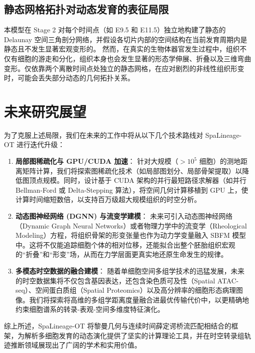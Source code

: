 \subsection{静态网格拓扑对动态发育的表征局限}
本模型在 Stage 2 对每个时间点（如 E9.5 和 E11.5）独立地构建了静态的 Delaunay 空间三角剖分网络，并假设各切片内部的空间结构在当前发育周期内是静态且不发生显著宏观变形的。
然而，在真实的生物体器官发生过程中，组织不仅有细胞的游走和分化，组织本身也会发生显著的形态学伸展、折叠以及三维弯曲变形。仅依靠两个离散时间点处独立的静态网格，在应对剧烈的非线性组织形变时，可能会丢失部分动态的几何拓扑关系。

\section{未来研究展望}
为了克服上述局限，我们在未来的工作中将从以下几个技术路线对 SpaLineage-OT 进行迭代升级：

\begin{enumerate}
    \item \textbf{局部图稀疏化与 GPU/CUDA 加速}：
    针对大规模（$>10^5$ 细胞）的测地距离矩阵计算，我们将探索图稀疏化技术（如局部图划分、局部骨架提取）以降低图顶点规模。同时，设计基于 CUDA 架构的并行最短路径求解器（如并行 Bellman-Ford 或 Delta-Stepping 算法），将空间几何计算移植到 GPU 上，使计算时间缩短数倍，以支持百万级超大规模组织的时空分析。
    
    \item \textbf{动态图神经网络 (DGNN) 与流变学建模}：
    未来可引入动态图神经网络（Dynamic Graph Neural Networks）或者物理力学中的流变学（Rheological Modeling）方程，将组织骨架的形变张量也作为动力学变量融入 SBFM 模型中。这将不仅能追踪细胞个体的相对位移，还能拟合出整个胚胎组织宏观的“折叠”和“形变”场，从而在力学层面更真实地还原生命发生的规律。
    
    \item \textbf{多模态时空数据的融合建模}：
    随着单细胞空间多组学技术的迅猛发展，未来的时空数据集将不仅包含基因表达，还包含染色质可及性（Spatial ATAC-seq）、空间蛋白质组（Spatial Proteomics）以及高分辨率的细胞形态病理图像。我们将探索将高维的多组学距离度量融合进最优传输代价中，以更精确地约束细胞谱系的转录-表观-空间多维度特征演化。
\end{enumerate}
综上所述，SpaLineage-OT 将黎曼几何与连续时间薛定谔桥流匹配相结合的框架，为解析多细胞发育的动态演化提供了坚实的计算理论工具，并在时空转录组轨迹推断领域展现出了广阔的学术和实用价值。
